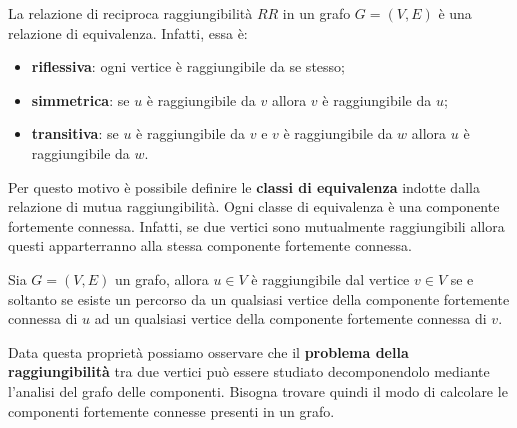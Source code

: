 La relazione di reciproca raggiungibilità $RR$ in un grafo $G=(V,E)$ è una relazione di equivalenza. Infatti, essa è:
\begin{itemize}
	\item \textbf{riflessiva}: ogni vertice è raggiungibile da se stesso;
	\item \textbf{simmetrica}: se $u$ è raggiungibile da $v$ allora $v$ è raggiungibile da $u$;
	\item \textbf{transitiva}: se $u$ è raggiungibile da $v$ e $v$ è raggiungibile da $w$ allora $u$ è raggiungibile da $w$.
\end{itemize}

Per questo motivo è possibile definire le \textbf{classi di equivalenza} indotte dalla relazione di mutua raggiungibilità. Ogni classe di equivalenza è una componente fortemente connessa. Infatti, se due vertici sono mutualmente raggiungibili allora questi apparterranno alla stessa componente fortemente connessa.


\begin{propbox}
	Sia $G=(V,E)$ un grafo, allora $u \in V $ è raggiungibile dal vertice $v \in V$ se e soltanto se esiste un percorso da un qualsiasi vertice della componente fortemente connessa di $u$ ad un qualsiasi vertice della componente fortemente connessa di $v$.
\end{propbox}

Data questa proprietà possiamo osservare che il \textbf{problema della raggiungibilità} tra due vertici può essere studiato decomponendolo mediante l'analisi del grafo delle componenti. Bisogna trovare quindi il modo di calcolare le componenti fortemente connesse presenti in un grafo.

